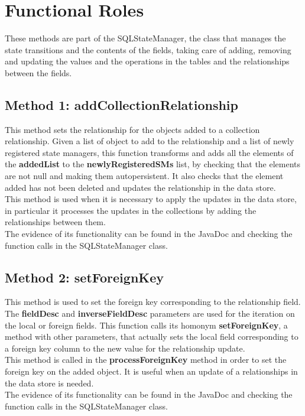 \documentclass[18pt,oneside,a4paper, titlepage]{article}
\begin{document}
\newpage
\section{Functional Roles}
	These methods are part of the SQLStateManager, the class that manages the state transitions and the contents of the fields, taking care of adding, removing and updating the values and the operations in the tables and the relationships between the fields.
	\subsection{Method 1: addCollectionRelationship}
		This method sets the relationship for the objects added to a collection relationship. Given a list of object to add to the relationship and a list of newly registered state managers, this function transforms and adds all the elements of the \textbf{addedList} to the \textbf{newlyRegisteredSMs} list, by checking that the elements are not null and making them autopersistent. It also checks that the element added has not been deleted and updates the relationship in the data store.\\
		This method is used when it is necessary to apply the updates in the data store, in particular it processes the updates in the collections by adding the relationships between them.\\		
		The evidence of its functionality can be found in the JavaDoc and checking the function calls in the SQLStateManager class.
	\subsection{Method 2: setForeignKey}
		This method is used to set the foreign key corresponding to the relationship field.\\ The \textbf{fieldDesc} and \textbf{inverseFieldDesc} parameters are used for the iteration on the local or foreign fields. This function calls its homonym \textbf{setForeignKey}, a method with other parameters, that actually sets the local field corresponding to a foreign key column to the new value for the relationship update.\\
		This method is called in the \textbf{processForeignKey} method in order to set the foreign key on the added object. It is useful when an update of a relationships in the data store is needed.\\		
		The evidence of its functionality can be found in the JavaDoc and checking the function calls in the SQLStateManager class.
\end{document}
